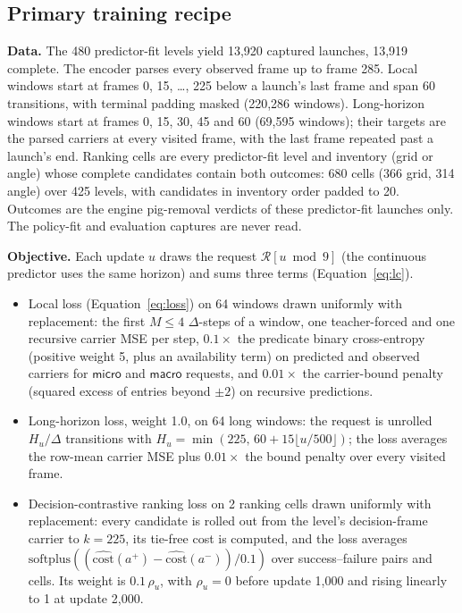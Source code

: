 \begin{revblock}

\subsection{Primary training recipe}

\textbf{Data.} The 480 predictor-fit levels yield 13,920 captured launches, 13,919 complete. The encoder parses every observed frame up to frame 285. Local windows start at frames 0, 15, \dots, 225 below a launch's last frame and span 60 transitions, with terminal padding masked (220,286 windows). Long-horizon windows start at frames 0, 15, 30, 45 and 60 (69,595 windows); their targets are the parsed carriers at every visited frame, with the last frame repeated past a launch's end. Ranking cells are every predictor-fit level and inventory (grid or angle) whose complete candidates contain both outcomes: 680 cells (366 grid, 314 angle) over 425 levels, with candidates in inventory order padded to 20. Outcomes are the engine pig-removal verdicts of these predictor-fit launches only. The policy-fit and evaluation captures are never read.

\textbf{Objective.} Each update $u$ draws the request $\mathcal{R}[u\bmod 9]$ (the continuous predictor uses the same horizon) and sums three terms (Equation~\ref{eq:lc}).
\begin{itemize}
\item Local loss (Equation~\ref{eq:loss}) on 64 windows drawn uniformly with replacement: the first $M\le4$ $\Delta$-steps of a window, one teacher-forced and one recursive carrier MSE per step, $0.1\times$ the predicate binary cross-entropy (positive weight 5, plus an availability term) on predicted and observed carriers for $\textsf{micro}$ and $\textsf{macro}$ requests, and $0.01\times$ the carrier-bound penalty (squared excess of entries beyond $\pm2$) on recursive predictions.
\item Long-horizon loss, weight 1.0, on 64 long windows: the request is unrolled $H_u/\Delta$ transitions with $H_u=\min(225,\,60+15\lfloor u/500\rfloor)$; the loss averages the row-mean carrier MSE plus $0.01\times$ the bound penalty over every visited frame.
\item Decision-contrastive ranking loss on 2 ranking cells drawn uniformly with replacement: every candidate is rolled out from the level's decision-frame carrier to $k=225$, its tie-free cost is computed, and the loss averages $\mathrm{softplus}((\widehat{\mathrm{cost}}(a^{+})-\widehat{\mathrm{cost}}(a^{-}))/0.1)$ over success--failure pairs and cells. Its weight is $0.1\,\rho_u$, with $\rho_u=0$ before update 1,000 and rising linearly to 1 at update 2,000.
\end{itemize}


\end{revblock}
